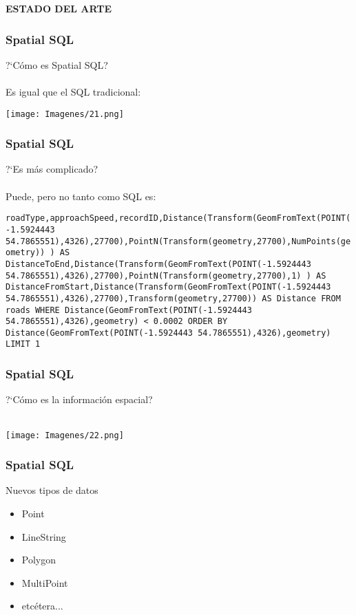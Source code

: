 \documentclass[12pt]{beamer}
\begin{document}
\begin{frame}
\begin{center}
\textbf{ESTADO DEL ARTE}
\end{center}
\end{frame}

\begin{frame}

\frametitle{Spatial SQL}
?`C\'omo es Spatial SQL?\\
\ \\
Es igual que el SQL tradicional:
\begin{center}
\texttt{[image: Imagenes/21.png]}
\end{center}
\end{frame}

\begin{frame}
\frametitle{Spatial SQL}
?`Es m\'as complicado?\\
\ \\
Puede, pero no tanto como SQL es:
\begin{center}
\begin{tiny}
\texttt{roadType,approachSpeed,recordID,Distance(Transform(GeomFromText(POINT(-1.5924443 54.7865551),4326),27700),PointN(Transform(geometry,27700),NumPoints(geometry)) ) AS DistanceToEnd,Distance(Transform(GeomFromText(POINT(-1.5924443 54.7865551),4326),27700),PointN(Transform(geometry,27700),1) ) AS DistanceFromStart,Distance(Transform(GeomFromText(POINT(-1.5924443 54.7865551),4326),27700),Transform(geometry,27700)) AS Distance FROM roads WHERE Distance(GeomFromText(POINT(-1.5924443 54.7865551),4326),geometry) < 0.0002 ORDER BY Distance(GeomFromText(POINT(-1.5924443 54.7865551),4326),geometry) LIMIT 1}
\end{tiny}
\end{center}
\end{frame}

\begin{frame}
\frametitle{Spatial SQL}
?`C\'omo es la informaci\'on espacial?\\
\ \\
\begin{center}
\texttt{[image: Imagenes/22.png]}
\end{center}
\end{frame}

\begin{frame}
\frametitle{Spatial SQL}
Nuevos tipos de datos
\begin{itemize}
\item Point
\item LineString
\item Polygon
\item MultiPoint
\item etc\'etera...
\end{itemize}

\end{frame}
\end{document}
